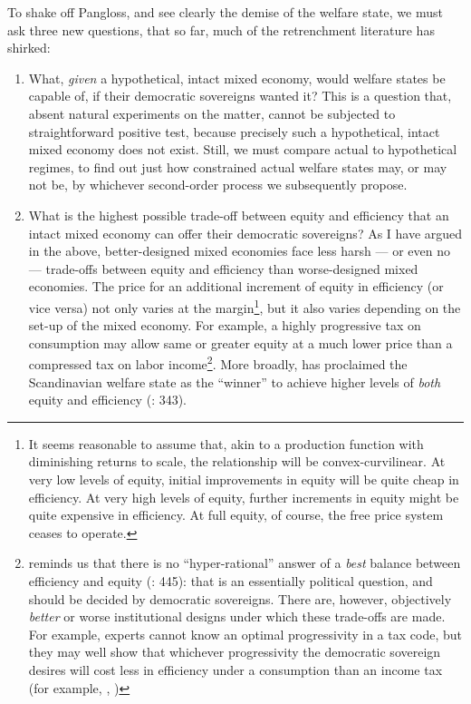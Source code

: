 
To shake off Pangloss, and see clearly the demise of the welfare state, we must ask three new questions, that so far, much of the retrenchment literature has shirked:
\begin{enumerate}
	\item What, \emph{given} a hypothetical, intact mixed economy, would welfare states be capable of, if their democratic sovereigns wanted it? This is a question that, absent natural experiments on the matter, cannot be subjected to straightforward positive test, because precisely such a hypothetical, intact mixed economy does not exist. Still, we must compare actual to hypothetical regimes, to find out just how constrained actual welfare states may, or may not be, by whichever second-order process we subsequently propose.
	
	\item What is the highest possible trade-off between equity and efficiency that an intact mixed economy can offer their democratic sovereigns? As I have argued in the above, better-designed mixed economies face less harsh --- or even no --- trade-offs between equity and efficiency than worse-designed mixed economies. The price for an additional increment of equity in efficiency (or vice versa) not only varies at the margin\footnote{
		It seems reasonable to assume that, akin to a production function with diminishing returns to scale, the relationship will be convex-curvilinear. At very low levels of equity, initial improvements in equity will be quite cheap in efficiency. At very high levels of equity, further increments in equity might be quite expensive in efficiency. At full equity, of course, the free price system ceases to operate.}, 
	but it also varies depending on the set-up of the mixed economy. For example, a highly progressive tax on consumption may allow same or greater equity at a much lower price than a compressed tax on labor income\footnote{
		\citeauthor{Offe2003} reminds us that there is no ``hyper-rational'' answer of a \emph{best} balance between efficiency and equity (\citeyear{Offe2003}: 445): that is an essentially political question, and should be decided by democratic sovereigns. There are, however, objectively \emph{better} or {worse} institutional designs under which these trade-offs are made. For example, experts cannot know an optimal progressivity in a tax code, but they may well show that whichever progressivity the democratic sovereign desires will cost less in efficiency under a consumption than an income tax (for example, \citealt{McCaffery2005}, \citealt{Frank2005})}.
	More broadly, \citeauthor{Ganssmann2010} has proclaimed the Scandinavian welfare state as the ``winner'' to achieve higher levels of \emph{both} equity and efficiency (\citeyear{Ganssmann2010}: 343). 
	

\end{enumerate}
